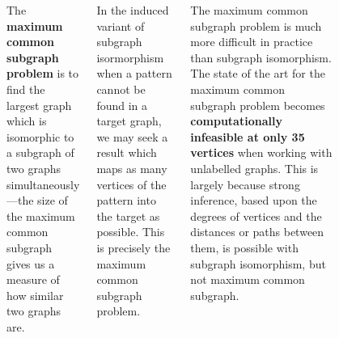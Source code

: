 \documentclass[a0paper]{tikzposter}
\begin{document}
\begin{columns}
{\begin{figure}
\begin{center}
\end{center}
\end{figure}

The \textbf{maximum common subgraph problem} is to find the largest graph which is isomorphic to
a subgraph of two graphs simultaneously---the size of the maximum common subgraph gives us a measure of how similar two graphs are.

\bigskip

In the induced variant of subgraph isormorphism when a pattern cannot be found in a target graph, we may seek a result which maps as many vertices of the pattern into the target as possible.  This is precisely the maximum common subgraph problem.

\bigskip

The maximum common subgraph problem is much more difficult in practice than subgraph isomorphism.
The state of the art for the maximum common subgraph
problem becomes \textbf{computationally
infeasible at only 35 vertices} when working with
unlabelled graphs. This is largely because strong inference,
based upon the degrees of vertices and the
distances or paths between them, is possible with subgraph isomorphism,
but not maximum common subgraph.}


\end{columns}
\end{document}
